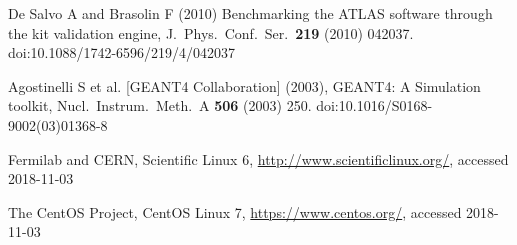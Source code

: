 \begin{thebibliography}{}
De Salvo A and Brasolin F (2010)
Benchmarking the ATLAS software through the kit validation engine,
J.\ Phys.\ Conf.\ Ser.\  {\bf 219} (2010) 042037.
doi:10.1088/1742-6596/219/4/042037


Agostinelli S  et al. [GEANT4 Collaboration] (2003),        
GEANT4: A Simulation toolkit,                          
Nucl.\ Instrum.\ Meth.\ A {\bf 506} (2003) 250.            
doi:10.1016/S0168-9002(03)01368-8                          


Fermilab and CERN,
Scientific Linux 6,
\url{http://www.scientificlinux.org/}, accessed 2018-11-03

The CentOS Project,
CentOS Linux 7,
\url{https://www.centos.org/}, accessed 2018-11-03


\end{thebibliography}




